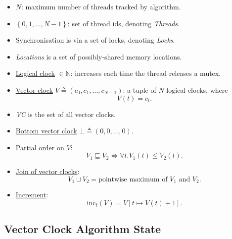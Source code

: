 \documentclass[twocolumn,landscape,10pt]{article}
\theoremstyle{definition}
\begin{document}
\begin{itemize}
    \item $N$: maximum number of threads tracked by algorithm.
    \item $\left\{0,1,\ldots,N - 1\right\}$: set of thread ids, denoting
        \emph{Threads}.
    \item Synchronisation is via a set of locks, denoting \emph{Locks}.
    \item \emph{Locations} is a set of possibly-shared memory locations.
    \item \underline{Logical clock} $\in\mathbb{N}$: increases each time the
        thread releases a mutex.
    \item \underline{Vector clock} $V\triangleq (c_0,c_1,\ldots,c_{N-1})$: 
        a tuple of $N$ logical clocks, where
        \[
            V(t)=c_t.
        \]
    \item \emph{VC} is the set of all vector clocks.
    \item \underline{Bottom vector clock} $\bot \triangleq(0,0,\ldots,0)$.
    \item \underline{Partial order on $V$}:
        \[
            V_1\sqsubseteq V_2 \iff \forall t.V_1(t)\le V_2(t).
        \]
    \item \underline{Join of vector clocks}:
        \[
            V_1\sqcup V_2 = \text{pointwise maximum of $V_1$ and $V_2$}.
        \]
    \item \underline{Increment}:
        \[
            \text{inc}_t(V)=V[t\mapsto V(t)+1].
        \]
\end{itemize} 

\subsection{Vector Clock Algorithm State}
\end{document}

